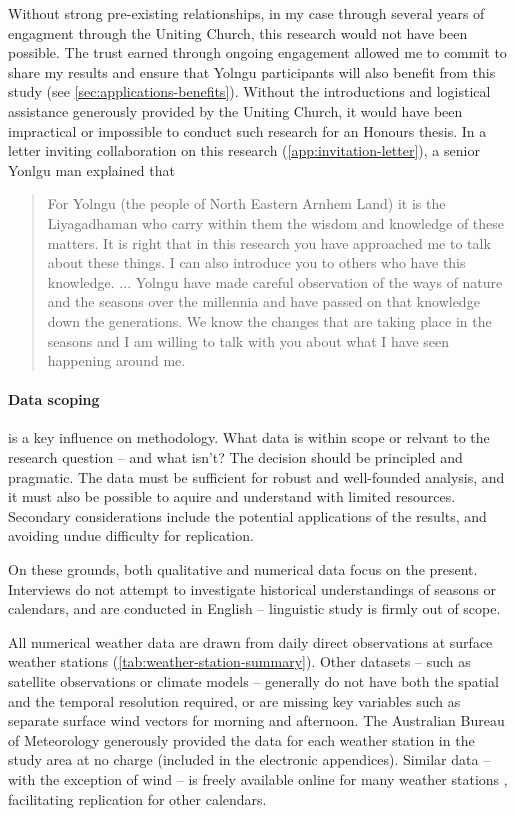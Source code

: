 Without strong pre-existing relationships, in my case through several
years of engagment through the Uniting Church, this research would not
have been possible.  The trust earned through ongoing engagement allowed
me to commit to share my results and ensure that Yolngu participants will
also benefit from this study (see \cref{sec:applications-benefits}).  Without the introductions and logistical
assistance generously provided by the Uniting Church, it would have been impractical or
impossible to conduct such research for an Honours thesis.
%
In a letter inviting collaboration on this research (\cref{app:invitation-letter}),
a senior Yonlgu man explained that
\begin{quote} %
    For Yolngu (the people of North Eastern Arnhem Land) it is the Liyagadhaman
    who carry within them the wisdom and knowledge of these matters.
    It is right that in this research you have approached me to talk about these
    things. I can also introduce you to others who have this knowledge.
    ...
    Yolngu have made careful observation of the ways of nature and the seasons
    over the millennia and have passed on that knowledge down the generations.
    We know the changes that are taking place in the seasons and I am willing
    to talk with you about what I have seen happening around me.
\end{quote}


\paragraph{Data scoping} is a key influence on methodology.
What data is within scope or relvant to the research question --
and what isn't?
%
The decision should be principled and pragmatic.
The data must be sufficient for robust and well-founded analysis,
and it must also be possible to aquire and understand with limited
resources.  Secondary considerations include the potential applications
of the results, and avoiding undue difficulty for replication.

On these grounds, both qualitative and numerical data focus on the present.
Interviews do not attempt to investigate historical understandings of
seasons or calendars, and are conducted in English --
linguistic study is firmly out of scope.

All numerical weather data are drawn from daily direct observations at
surface weather stations (\cref{tab:weather-station-summary}).
Other datasets -- such as satellite observations or
climate models -- generally do not have both the spatial and the
temporal resolution required, or are missing key variables such as separate
surface wind vectors for morning and afternoon.
%
%
The Australian Bureau of Meteorology generously provided the data for each
weather station in the study area at no charge (included in the electronic appendices).
Similar data -- with the exception of wind -- is freely available online
for many weather stations , facilitating replication for other
calendars.


